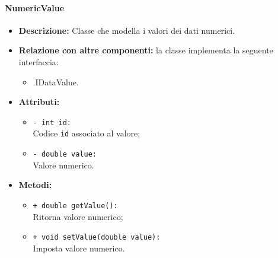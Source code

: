 \paragraph{NumericValue}
\label{botnumericvalue}
\begin{flushleft}
\begin{itemize}
\item \textbf{Descrizione:} Classe che modella i valori dei dati numerici.
\item \textbf{Relazione con altre componenti:} la classe implementa la seguente interfaccia:
		\begin{itemize}
			\item \smodel{}.IDataValue.
		\end{itemize}
\item \textbf{Attributi:}
\begin{sloppypar}
\begin{itemize}
\item \texttt{- int id:}\\ Codice \texttt{id} associato al valore;
\item \texttt{- double value:}\\ Valore numerico.
\end{itemize}
\end{sloppypar}
\item \textbf{Metodi:}
\begin{sloppypar}
\begin{itemize}
\item \texttt{+ double getValue():}\\ Ritorna valore numerico;
\item \texttt{+ void setValue(double value):}\\ Imposta valore numerico.
\end{itemize}
\end{sloppypar}
\end{itemize}
\end{flushleft}

